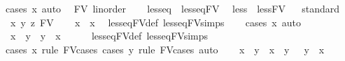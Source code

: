 \begin{isabellebody}
%
\isadelimproof
%
\endisadelimproof
%
\isatagproof
{}\isamarkupfalse%
{\isacharparenleft}{\kern0pt}cases\ x{\isacharcomma}{\kern0pt}\ auto{\isacharparenright}{\kern0pt}\ \isamarkupfalse%
%
\endisatagproof
{\isafoldproof}%
%
\isadelimproof
\isanewline
%
\endisadelimproof
\isanewline
{}\isamarkupfalse%
\ FV\ {\isacharcolon}{\kern0pt}{\isacharcolon}{\kern0pt}linorder\ \isanewline
{}\ \isanewline
{}\isamarkupfalse%
\ {\isachardoublequoteopen}less{\isacharunderscore}{\kern0pt}eq\ {\isasymequiv}\ less{\isacharunderscore}{\kern0pt}eq{\isacharunderscore}{\kern0pt}FV{\isachardoublequoteclose}\ \isanewline
{}\isamarkupfalse%
\ {\isachardoublequoteopen}less\ {\isasymequiv}\ less{\isacharunderscore}{\kern0pt}FV{\isachardoublequoteclose}\ \isanewline
\isanewline
{}\isamarkupfalse%
\ \isanewline
%
\isadelimproof
%
\endisadelimproof
%
\isatagproof
{}\isamarkupfalse%
{\isacharparenleft}{\kern0pt}standard{\isacharparenright}{\kern0pt}\isanewline
\ \ \isamarkupfalse%
\ x\ y\ z\ {\isacharcolon}{\kern0pt}{\isacharcolon}{\kern0pt}FV\isanewline
\ \ \isamarkupfalse%
\ {\isachardoublequoteopen}x\ {\isasymle}\ x{\isachardoublequoteclose}\ \isamarkupfalse%
\ less{\isacharunderscore}{\kern0pt}eq{\isacharunderscore}{\kern0pt}FV{\isacharunderscore}{\kern0pt}def\ less{\isacharunderscore}{\kern0pt}eq{\isacharunderscore}{\kern0pt}FV{\isachardot}{\kern0pt}simps\ \isanewline
\ \ \isamarkupfalse%
{\isacharparenleft}{\kern0pt}cases\ x{\isacharcomma}{\kern0pt}\ auto{\isacharparenright}{\kern0pt}\ \isamarkupfalse%
\isanewline
\ \ \isamarkupfalse%
\ {\isachardoublequoteopen}x\ {\isasymle}\ y\ {\isasymor}\ y\ {\isasymle}\ x{\isachardoublequoteclose}\isanewline
\ \ \ \ \isamarkupfalse%
\ less{\isacharunderscore}{\kern0pt}eq{\isacharunderscore}{\kern0pt}FV{\isacharunderscore}{\kern0pt}def\ less{\isacharunderscore}{\kern0pt}eq{\isacharunderscore}{\kern0pt}FV{\isachardot}{\kern0pt}simps\ \isanewline
\ \ \ \ \isamarkupfalse%
{\isacharparenleft}{\kern0pt}cases\ x\ rule{\isacharcolon}{\kern0pt}\ FV{\isacharunderscore}{\kern0pt}cases{\isacharparenright}{\kern0pt}\ {\isacharparenleft}{\kern0pt}cases\ y\ rule{\isacharcolon}{\kern0pt}\ FV{\isacharunderscore}{\kern0pt}cases{\isacharcomma}{\kern0pt}\ auto{\isacharparenright}{\kern0pt}{\isacharplus}{\kern0pt}\isanewline
\ \ \isamarkupfalse%
\ {\isachardoublequoteopen}{\isacharparenleft}{\kern0pt}x\ {\isacharless}{\kern0pt}\ y{\isacharparenright}{\kern0pt}\ {\isacharequal}{\kern0pt}\ {\isacharparenleft}{\kern0pt}x\ {\isasymle}\ y\ {\isasymand}\ {\isasymnot}\ y\ {\isasymle}\ x{\isacharparenright}{\kern0pt}{\isachardoublequoteclose}\isanewline

\end{isabellebody}
